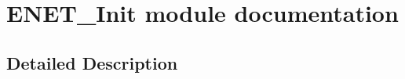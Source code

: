 \hypertarget{group___e_n_e_t___init__module}{}\section{E\+N\+E\+T\+\_\+\+Init module documentation}
\label{group___e_n_e_t___init__module}


\subsection{Detailed Description}
